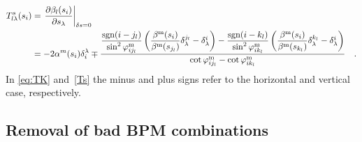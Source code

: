   \begin{align}
      T^s_{l\lambda}(s_i) &= \left.\frac{\partial \beta_l(s_i)}{\partial s_\lambda}\right|_{\delta s = 0} \notag \\
      &= -2\alpha^m(s_i)\delta_i^{\lambda}
      \mp 
      \frac{
          \dfrac{\text{sgn}(i-j_l)}{\sin^2 \varphi_{ij_l}^\text{m}}\left(\dfrac{\beta^\text{m}(s_i)}{\beta^\text{m}(s_{j_l})}\delta^{j_l}_\lambda - \delta_\lambda^i\right) -
          \dfrac{\text{sgn}(i-k_l)}{\sin^2 \varphi_{ik_l}^\text{m}}\left(\dfrac{\beta^\text{m}(s_i)}{\beta^\text{m}(s_{k_l})}\delta^{k_l}_\lambda - \delta_\lambda^i\right)}
      {\cot \varphi_{ij_l}^\text{m} - \cot \varphi_{ik_l}^\text{m}} \quad .
      \label{Ts}
  \end{align}
  In \eqref{eq:TK} and~\eqref{Ts} the minus and plus signs refer to the horizontal and vertical case, respectively. 

\subsection{Removal of bad BPM combinations}


